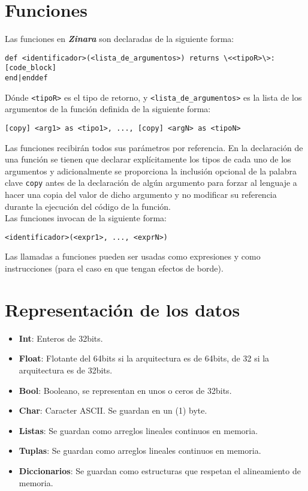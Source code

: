 \documentclass[12pt, spanish]{report}
\begin{document}
\chapter{Funciones}
\label{sec:func}

Las funciones en \emph{\textbf{Zinara}} son declaradas de la siguiente
forma:

\begin{verbatim}
def <identificador>(<lista_de_argumentos>) returns \<<tipoR>\>:
[code_block]
end|enddef
\end{verbatim}

D\'onde \texttt{<tipoR>} es el tipo de retorno, y
\texttt{<lista\_de\_argumentos>} es la lista de los argumentos de la
funci\'on definida de la siguiente forma:

\begin{verbatim}
[copy] <arg1> as <tipo1>, ..., [copy] <argN> as <tipoN>
\end{verbatim}

Las funciones recibir\'an todos sus par\'ametros por referencia. En la
declaraci\'on de una funci\'on se tienen que declarar expl\'icitamente los
tipos de cada uno de los argumentos y adicionalmente se proporciona la
inclusi\'on opcional de la palabra clave \texttt{copy} antes de la
declaraci\'on de alg\'un argumento para forzar al lenguaje a hacer una
copia del valor de dicho argumento y no modificar su referencia
durante la ejecuci\'on del c\'odigo de la funci\'on.\\

Las funciones invocan de la siguiente forma:

\begin{verbatim}
<identificador>(<expr1>, ..., <exprN>)
\end{verbatim}

Las llamadas a funciones pueden ser usadas como expresiones y como
instrucciones (para el caso en que tengan efectos de borde).

\chapter{Representaci\'on de los datos}
\label{chap:impl}
\begin{itemize}
\item \textbf{Int}: Enteros de 32bits.
\item \textbf{Float}: Flotante del 64bits si la arquitectura es de
                      64bits, de 32 si la arquitectura es de 32bits.
\item \textbf{Bool}: Booleano, se representan en unos o ceros de 32bits.
\item \textbf{Char}: Caracter ASCII. Se guardan en un (1) byte.
\item \textbf{Listas}: Se guardan como arreglos lineales continuos en memoria.
\item \textbf{Tuplas}: Se guardan como arreglos lineales continuos en memoria.
\item \textbf{Diccionarios}: Se guardan como estructuras que respetan el alineamiento
                       de memoria.
\end{itemize}
\end{document}

